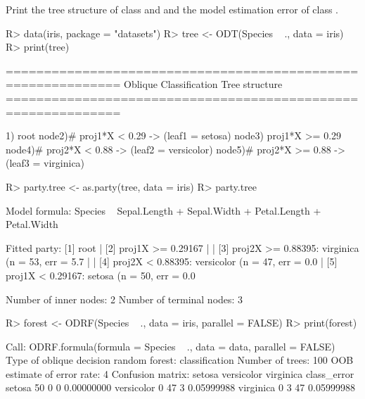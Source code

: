 \documentclass[nojss]{jss}
\numberwithin{equation}{section}
\begin{document}
%
Print the tree structure of class  and  and the model estimation error of class .
%
\begin{Schunk}
\begin{Sinput}
R> data(iris, package = "datasets")
R> tree <- ODT(Species ~ ., data = iris)
R> print(tree)
\end{Sinput}
\begin{Soutput}
============================================================= 
Oblique Classification Tree structure 
=============================================================

1) root
   node2)# proj1*X < 0.29 -> (leaf1 = setosa)
   node3)  proj1*X >= 0.29
      node4)# proj2*X < 0.88 -> (leaf2 = versicolor)
      node5)# proj2*X >= 0.88 -> (leaf3 = virginica)
\end{Soutput}
\begin{Sinput}
R> party.tree <- as.party(tree, data = iris)
R> party.tree
\end{Sinput}
\begin{Soutput}
Model formula:
Species ~ Sepal.Length + Sepal.Width + Petal.Length + Petal.Width

Fitted party:
[1] root
|   [2] proj1X >= 0.29167
|   |   [3] proj2X >= 0.88395: virginica (n = 53, err = 5.7%
|   |   [4] proj2X < 0.88395: versicolor (n = 47, err = 0.0%
|   [5] proj1X < 0.29167: setosa (n = 50, err = 0.0%

Number of inner nodes:    2
Number of terminal nodes: 3
\end{Soutput}
\begin{Sinput}
R> forest <- ODRF(Species ~ ., data = iris, parallel = FALSE)
R> print(forest)
\end{Sinput}
\begin{Soutput}
Call:
 ODRF.formula(formula = Species ~ ., data = data, parallel = FALSE) 
               Type of oblique decision random forest: classification
                                      Number of trees: 100
                           OOB estimate of error rate: 4%
Confusion matrix:
           setosa versicolor virginica class_error
setosa         50          0         0  0.00000000
versicolor      0         47         3  0.05999988
virginica       0          3        47  0.05999988
\end{Soutput}
\end{Schunk}
\end{document}
